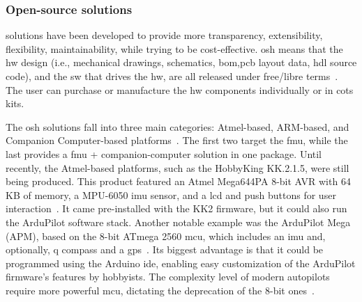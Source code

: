 \subsubsection{Open-source solutions}%
\label{sec:open-source-solut-hw}
 solutions have been developed to provide more transparency,
extensibility, flexibility, maintainability, while trying to be
cost-effective. \gls{osh} means that the \gls{hw} design (i.e., mechanical
drawings, schematics, \gls{bom},\gls{pcb} layout data, \gls{hdl} source code),
and the \gls{sw} that drives the \gls{hw}, are all released under free/libre
terms~\cite{freeGNU}.
The user can purchase or manufacture the \gls{hw} components
individually or in \gls{cots} kits.

The \gls{osh} solutions fall into three main categories: Atmel-based,
ARM-based, and Companion Computer-based
platforms~\cite{ebeidUAVPlatformsSurvey2017}. The first two target the
\gls{fmu}, while the last provides a \gls{fmu} + companion-computer solution in
one package. Until recently, the Atmel-based platforms, such as the HobbyKing
KK.2.1.5, were still being produced. This product featured an Atmel Mega644PA
8-bit AVR with 64 KB of memory, a MPU-6050 \gls{imu} sensor, and a \gls{lcd} and
push buttons for user interaction~\cite{hobbykingKK2}. It came pre-installed
with the KK2 firmware, but it could also run the ArduPilot software
stack. Another notable example was the ArduPilot Mega (APM), based on the
8-bit ATmega 2560 \gls{mcu}, which includes an \gls{imu} and, optionally, q
compass and a \gls{gps}~\cite{ardupilotMega}. Its biggest advantage is that it could be programmed using the
Arduino \gls{ide}, enabling easy customization of the ArduPilot firmware's
features by hobbyists. The complexity level of modern autopilots require more
powerful \gls{mcu}, dictating the deprecation of the 8-bit ones~\cite{fmu8BitDeprecation}.  

